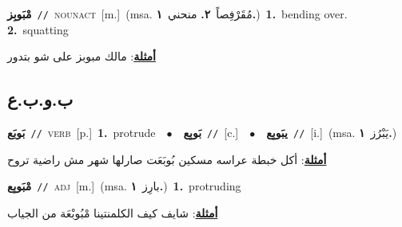 \documentclass[10pt,a4paper,twoside]{article} %
\begin{document}
\begin{multicols}{2}
{\setlength\topsep{0pt}\textbf{\foreignlanguage{arabic}{مْبَوبِز}}\ {\color{gray}\texttt{//}\color{black}}\ \textsc{noun\textunderscore act}\ [m.]\ \color{gray}(msa. \foreignlanguage{arabic}{مُقَرْفِصاً}~\foreignlanguage{arabic}{\textbf{٢.}}  \foreignlanguage{arabic}{منحني}~\foreignlanguage{arabic}{\textbf{١.}})\color{black}\ \textbf{1.}~bending over.  \textbf{2.}~squatting\  \begin{flushright}\color{gray}\foreignlanguage{arabic}{\textbf{\underline{\foreignlanguage{arabic}{أمثلة}}}: مالك مبوبز على شو بتدور}\end{flushright}\color{black}} \vspace{2mm}

\vspace{-3mm}
\subsection*{\color{blue}\foreignlanguage{arabic}{ب.و.ب.ع}\color{blue}{}} 

{\setlength\topsep{0pt}\textbf{\foreignlanguage{arabic}{بَوبَع}}\ {\color{gray}\texttt{//}\color{black}}\ \textsc{verb}\ [p.]\ \textbf{1.}~protrude\ \ $\bullet$\ \ \setlength\topsep{0pt}\textbf{\foreignlanguage{arabic}{بَوبِع}}\ {\color{gray}\texttt{//}\color{black}}\ [c.]\ \ $\bullet$\ \ \setlength\topsep{0pt}\textbf{\foreignlanguage{arabic}{يبَوبِع}}\ {\color{gray}\texttt{//}\color{black}}\ [i.]\ \color{gray}(msa. \foreignlanguage{arabic}{يَبْرُز}~\foreignlanguage{arabic}{\textbf{١.}})\color{black}\  \begin{flushright}\color{gray}\foreignlanguage{arabic}{\textbf{\underline{\foreignlanguage{arabic}{أمثلة}}}: أكل خبطة عراسه مسكين بُوبَعَت صارلها شهر مش راضية تروح}\end{flushright}\color{black}} \vspace{2mm}

{\setlength\topsep{0pt}\textbf{\foreignlanguage{arabic}{مْبَوبِع}}\ {\color{gray}\texttt{//}\color{black}}\ \textsc{adj}\ [m.]\ \color{gray}(msa. \foreignlanguage{arabic}{بارِز}~\foreignlanguage{arabic}{\textbf{١.}})\color{black}\ \textbf{1.}~protruding\  \begin{flushright}\color{gray}\foreignlanguage{arabic}{\textbf{\underline{\foreignlanguage{arabic}{أمثلة}}}: شايف كيف الكلمنتينا مْبُوبْعَة من الجياب}\end{flushright}\color{black}} \vspace{2mm}


\end{multicols}
\end{document}
